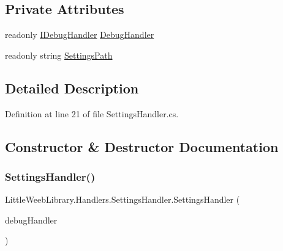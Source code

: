\subsection*{Private Attributes}
\begin{DoxyCompactItemize}
\item 
readonly \mbox{\hyperlink{interface_little_weeb_library_1_1_handlers_1_1_i_debug_handler}{I\+Debug\+Handler}} \mbox{\hyperlink{class_little_weeb_library_1_1_handlers_1_1_settings_handler_a80da61f3a3fcbb5f9ac6057591a98acf}{Debug\+Handler}}
\item 
readonly string \mbox{\hyperlink{class_little_weeb_library_1_1_handlers_1_1_settings_handler_a2e309fc6b949f0bb7e7ace8c2017be7f}{Settings\+Path}}
\end{DoxyCompactItemize}


\subsection{Detailed Description}


Definition at line 21 of file Settings\+Handler.\+cs.



\subsection{Constructor \& Destructor Documentation}
\mbox{\label{class_little_weeb_library_1_1_handlers_1_1_settings_handler_a6b11494ae34a6ff54b825941ef06cdb2}} 
\subsubsection{\texorpdfstring{Settings\+Handler()}{SettingsHandler()}}
{\footnotesize\ttfamily Little\+Weeb\+Library.\+Handlers.\+Settings\+Handler.\+Settings\+Handler (\begin{DoxyParamCaption}\item[{\mbox{\hyperlink{interface_little_weeb_library_1_1_handlers_1_1_i_debug_handler}{I\+Debug\+Handler}}}]{debug\+Handler }\end{DoxyParamCaption})}



